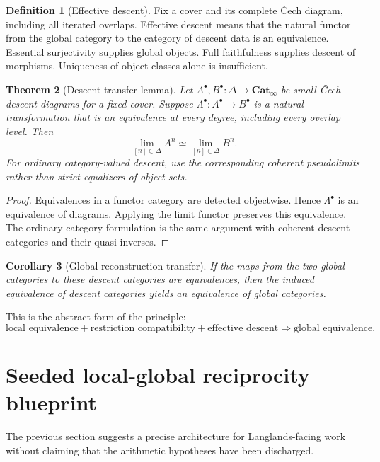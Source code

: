 \documentclass[11pt]{article}
\newtheorem{theorem}{Theorem}[section]
\newtheorem{corollary}[theorem]{Corollary}
\theoremstyle{definition}
\newtheorem{definition}[theorem]{Definition}
\theoremstyle{remark}
\newcommand{\Cat}{\mathbf{Cat}}
\begin{document}
\begin{definition}[Effective descent]
Fix a cover and its complete \v{C}ech diagram, including all iterated overlaps. Effective descent means that the natural functor from the global category to the category of descent data is an equivalence. Essential surjectivity supplies global objects. Full faithfulness supplies descent of morphisms. Uniqueness of object classes alone is insufficient.
\end{definition}

\begin{theorem}[Descent transfer lemma]\label{thm:descent-transfer}
Let $A^\bullet,B^\bullet:\Delta\to\Cat_\infty$ be small \v{C}ech descent diagrams for a fixed cover. Suppose $\Lambda^\bullet:A^\bullet\to B^\bullet$ is a natural transformation that is an equivalence at every degree, including every overlap level. Then
\[
\lim_{[n]\in\Delta} A^n\simeq\lim_{[n]\in\Delta} B^n.
\]
For ordinary category-valued descent, use the corresponding coherent pseudolimits rather than strict equalizers of object sets.
\end{theorem}

\begin{proof}
Equivalences in a functor category are detected objectwise. Hence $\Lambda^\bullet$ is an equivalence of diagrams. Applying the limit functor preserves this equivalence. The ordinary category formulation is the same argument with coherent descent categories and their quasi-inverses.
\end{proof}

\begin{corollary}[Global reconstruction transfer]\label{cor:global-transfer}
If the maps from the two global categories to these descent categories are equivalences, then the induced equivalence of descent categories yields an equivalence of global categories.
\end{corollary}

This is the abstract form of the principle:
\[
\boxed{
\text{local equivalence}
+
\text{restriction compatibility}
+
\text{effective descent}
\Longrightarrow
\text{global equivalence}.
}
\]

\section{Seeded local-global reciprocity blueprint}

The previous section suggests a precise architecture for Langlands-facing work without claiming that the arithmetic hypotheses have been discharged.
\end{document}
